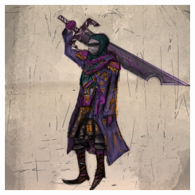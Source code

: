 \begin{center}
\includegraphics[width=80mm]{./content/img/otoria1.png}
\begin{figure}[h]
\end{figure}
\end{center}

\clearpage